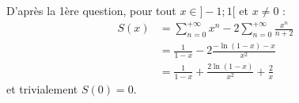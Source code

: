 {\begin{enumerate}
{		D'après la 1ère question, pour tout $x \in ]-1;1[$ et $x \neq 0$ :
		\begin{align*}
			S(x) &=  \sum_{n=0}^{+\infty} x^n - 2\sum_{n=0}^{+\infty}\frac{x^{n}}{n+2} \\
			&= \frac{1}{1-x} -2\frac{-\ln(1-x)-x}{x^2}\\
			&= \frac{1}{1-x} + \frac{2\ln(1-x)}{x^2} + \frac{2}{x} 
		\end{align*}	
		et trivialement $S(0) = 0$. 
		
	}
\end{enumerate}
}